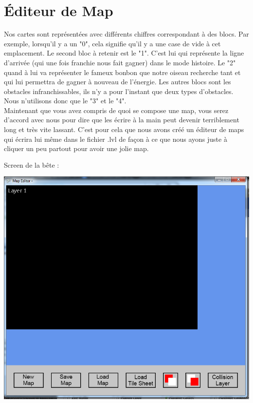 \documentclass [11pt]{report}
\begin{document}
	\section{\'Editeur de Map}
						
			Nos cartes sont représentées avec différents chiffres correspondant à des blocs. Par exemple, lorsqu'il y a un "0", cela signifie qu'il y a une case de vide à cet emplacement. Le second bloc à retenir est le "1". C'est lui qui représente la ligne d'arrivée (qui une fois franchie nous fait gagner) dans le mode histoire. Le "2" quand à lui va représenter le fameux bonbon que notre oiseau recherche tant et qui lui permettra de gagner à nouveau de l'énergie. Les autres blocs sont les obstacles infranchissables, ils n'y a pour l'instant que deux types d'obstacles. Nous n'utilisons donc que le "3" et le "4".\\
			
			\indent Maintenant que vous avez compris de quoi se compose une map, vous serez d'accord avec nous pour dire que les écrire à la main peut devenir terriblement long et très vite lassant. C'est pour cela que nous avons créé un éditeur de maps qui écrira lui même dans le fichier .lvl de façon à ce que nous ayons juste à cliquer un peu partout pour avoir une jolie map.
			
			\vspace{10mm}
			
	\noindent Screen de la bête : 
						
		\vspace{4mm}
		
			\begin{center}
			\includegraphics[scale = 0.4]{images/EditeurMap.png}
			\end{center}
			
\end{document}

